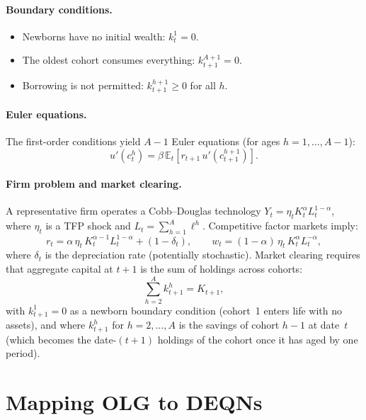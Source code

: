 \documentclass[11pt,a4paper]{report}
\begin{document}
\paragraph{Boundary conditions.}
\begin{itemize}[itemsep=2pt]
\item Newborns have no initial wealth: $k_t^1 = 0$.
\item The oldest cohort consumes everything: $k_{t+1}^{A+1} = 0$.
\item Borrowing is not permitted: $k_{t+1}^{h+1} \geq 0$ for all $h$.
\end{itemize}

\paragraph{Euler equations.}
The first-order conditions yield $A-1$ Euler equations (for ages $h=1,\ldots,A-1$):
\begin{equation}
u'(c_t^h) = \beta\,\mathbb{E}_t\!\left[r_{t+1}\, u'(c_{t+1}^{h+1})\right].
\label{eq:olg_euler}
\end{equation}

\paragraph{Firm problem and market clearing.}
A representative firm operates a Cobb--Douglas technology $Y_t = \eta_t K_t^\alpha L_t^{1-\alpha}$, where $\eta_t$ is a TFP shock and $L_t = \sum_{h=1}^A \ell^h$.  Competitive factor markets imply:
\begin{equation}
r_t = \alpha\,\eta_t\, K_t^{\alpha-1}L_t^{1-\alpha} + (1-\delta_t), \qquad
w_t = (1-\alpha)\,\eta_t\, K_t^\alpha L_t^{-\alpha},
\label{eq:olg_prices}
\end{equation}
where $\delta_t$ is the depreciation rate (potentially stochastic).  Market clearing requires that aggregate capital at $t+1$ is the sum of holdings across cohorts:
\begin{equation}
\sum_{h=2}^{A} k_{t+1}^{h} = K_{t+1},
\label{eq:olg_mc}
\end{equation}
with $k_{t+1}^{1}=0$ as a newborn boundary condition (cohort~1 enters life with no assets), and where $k_{t+1}^{h}$ for $h=2,\dots,A$ is the savings of cohort $h-1$ at date~$t$ (which becomes the date-$(t+1)$ holdings of the cohort once it has aged by one period).

\section{Mapping OLG to DEQNs}
\label{sec:olg_deqn}
\end{document}
